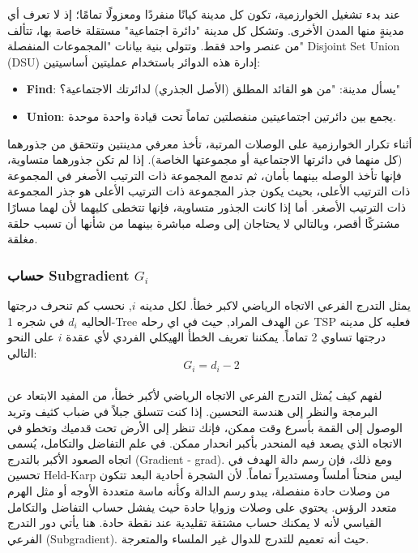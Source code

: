 \documentclass{article}
\newcommand{\en}[1]{\textenglish{#1}}
\begin{document}
عند بدء تشغيل الخوارزمية، تكون كل مدينة كيانًا منفردًا ومعزولًا تمامًا؛ إذ لا تعرف أي مدينةٍ منها المدن الأخرى. وتشكل كل مدينة "دائرة اجتماعية" مستقلة خاصة بها، تتألف من عنصر واحد فقط. وتتولى بنية بيانات "المجموعات المنفصلة" \en{Disjoint Set Union (DSU)} إدارة هذه الدوائر باستخدام عمليتين أساسيتين:\\

	\begin{itemize}
		\item \textbf{\en{Find}}:
	يسأل مدينة: "من هو القائد المطلق (الأصل الجذري) لدائرتك الاجتماعية؟"
		\item \textbf{\en{Union}}:
	يجمع بين دائرتين اجتماعيتين منفصلتين تماماً تحت قيادة واحدة موحدة.
	\end{itemize}

أثناء تكرار الخوارزمية على الوصلات المرتبة، تأخذ معرفي مدينتين وتتحقق من جذورهما (كل منهما في دائرتها الاجتماعية أو مجموعتها الخاصة). إذا لم تكن جذورهما متساوية، فإنها تأخذ الوصله بينهما بأمان، ثم تدمج المجموعة ذات الترتيب الأصغر في المجموعة ذات الترتيب الأعلى، بحيث يكون جذر المجموعة ذات الترتيب الأعلى هو جذر المجموعة ذات الترتيب الأصغر. أما إذا كانت الجذور متساوية، فإنها تتخطى كليهما لأن لهما مسارًا مشتركًا أقصر، وبالتالي لا يحتاجان إلى وصله مباشرة بينهما من شأنها أن تسبب حلقة مغلقة.\\

\subsubsection{حساب \en{Subgradient $G_i$}}
يمثل التدرج الفرعي الاتجاه الرياضي لاكبر خطأ. لكل مدينه $i$, نحسب كم تنحرف درجتها الحاليه $d_i$ في شجره \en{1-Tree} عن الهدف المراد, حيث في اي رحله \en{TSP} فعليه كل مدينه درجتها تساوي 2 تماماً. يمكننا تعريف الخطأ الهيكلي الفردي لأي عقدة $i$ على النحو التالي:\\

		{\LARGE$$
		G_i = d_i - 2
	$$}\\

لفهم كيف يُمثل التدرج الفرعي الاتجاه الرياضي لأكبر خطأ، من المفيد الابتعاد عن البرمجة والنظر إلى هندسة التحسين. إذا كنت تتسلق جبلاً في ضباب كثيف وتريد الوصول إلى القمة بأسرع وقت ممكن، فإنك تنظر إلى الأرض تحت قدميك وتخطو في الاتجاه الذي يصعد فيه المنحدر بأكبر انحدار ممكن. في علم التفاضل والتكامل، يُسمى اتجاه الصعود الأكبر بالتدرج (\en{Gradient - grad}). ومع ذلك، فإن رسم دالة الهدف في تحسين Held-Karp ليس منحناً أملساً ومستديراً تماماً. لأن الشجرة أحادية البعد تتكون من وصلات حادة منفصلة، يبدو رسم الدالة وكأنه ماسة متعددة الأوجه أو مثل الهرم متعدد الرؤس. يحتوي على وصلات وزوايا حادة حيث يفشل حساب التفاضل والتكامل القياسي لأنه لا يمكنك حساب مشتقة تقليدية عند نقطة حادة. هنا يأتي دور التدرج الفرعي (\en{Subgradient}). حيث أنه تعميم للتدرج للدوال غير الملساء والمتعرجة.\\
\end{document}
